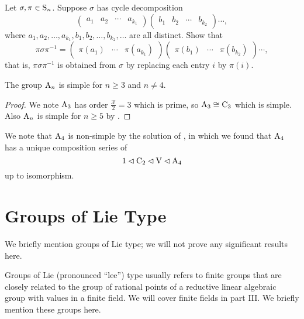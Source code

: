 \begin{exercise}\label{exercise-conjugation-of-permutation-by-another}
    Let $\sigma, \pi \in \mathrm{S}_{n}$. Suppose $\sigma$ has cycle decomposition
    \[
        \begin{pmatrix}a_1&a_2&\cdots&a_{k_1}\end{pmatrix} \begin{pmatrix}b_1&b_2&\cdots&b_{k_2}\end{pmatrix}\cdots,
    \]
    where $a_1, a_2, \dots, a_{k_1}, b_1, b_2, \dots, b_{k_2}, \dots$ are all distinct. Show that
    \[
        \pi\sigma\pi^{-1} = \begin{pmatrix}\pi(a_1)&\cdots&\pi(a_{k_1})\end{pmatrix} \begin{pmatrix}\pi(b_1)&\cdots&\pi(b_{k_2})\end{pmatrix}\cdots,
    \]
    that is, $\pi\sigma\pi^{-1}$ is obtained from $\sigma$ by replacing each entry $i$ by $\pi(i)$.
\end{exercise}

\begin{corollary}
    The group $\mathrm{A}_{n}$ is simple for $n \geq 3$ and $n \neq 4$.
\end{corollary}
\begin{proof}
    We note $\mathrm{A}_{3}$ has order $\frac{3!}{2} = 3$ which is prime, so $\mathrm{A}_{3} \cong \mathrm{C}_{3}$ which is simple. Also $\mathrm{A}_{n}$ is simple for $n \geq 5$ by .
\end{proof}

We note that $\mathrm{A}_{4}$ is non-simple by the solution of , in which we found that $\mathrm{A}_{4}$ has a unique composition series of
\[
    1 \lhd \mathrm{C}_{2} \lhd \mathrm{V} \lhd \mathrm{A}_{4}
\]
up to isomorphism.

\section{Groups of Lie Type}
We briefly mention groups of Lie type; we will not prove any significant results here.

Groups of Lie (pronounced ``lee'') type usually refers to finite groups that are closely related to the group of rational points of a reductive linear algebraic group with values in a finite field. We will cover finite fields in part III. We briefly mention these groups here.

